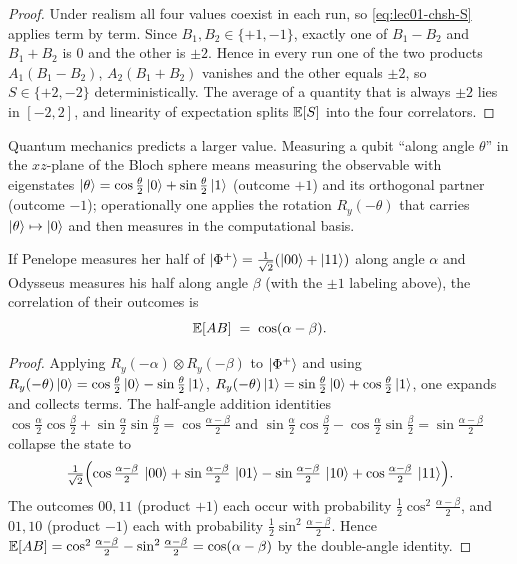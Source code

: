 \begin{proof}
Under realism all four values coexist in each run, so \eqref{eq:lec01-chsh-S} applies
term by term. Since $B_1,B_2\in\{+1,-1\}$, exactly one of $B_1-B_2$ and $B_1+B_2$
is $0$ and the other is $\pm2$. Hence in every run one of the two products
$A_1(B_1-B_2)$, $A_2(B_1+B_2)$ vanishes and the other equals $\pm2$, so $S\in\{+2,-2\}$
deterministically. The average of a quantity that is always $\pm2$ lies in $[-2,2]$,
and linearity of expectation splits $\mathbb{E}[S]$ into the four correlators.
\end{proof}

Quantum mechanics predicts a larger value. Measuring a qubit ``along angle $\theta$''
in the $xz$-plane of the Bloch sphere means measuring the observable with eigenstates
$\ket{\theta}=\cos\tfrac{\theta}{2}\ket{0}+\sin\tfrac{\theta}{2}\ket{1}$ (outcome
$+1$) and its orthogonal partner (outcome $-1$); operationally one applies the
rotation $R_y(-\theta)$ that carries $\ket{\theta}\mapsto\ket{0}$ and then measures in
the computational basis.

\begin{proposition}\label{prop:lec01-chsh-corr}
If Penelope measures her half of $\ket{\Phi^{+}}=\tfrac{1}{\sqrt2}(\ket{00}+\ket{11})$
along angle $\alpha$ and Odysseus measures his half along angle $\beta$ (with the $\pm1$
labeling above), the correlation of their outcomes is
\begin{equation}\label{eq:lec01-chsh-cosab}
  \mathbb{E}[AB]\;=\;\cos(\alpha-\beta).
\end{equation}
\end{proposition}

\begin{proof}
Applying $R_y(-\alpha)\otimes R_y(-\beta)$ to $\ket{\Phi^{+}}$ and using
$R_y(-\theta)\ket{0}=\cos\tfrac{\theta}{2}\ket{0}-\sin\tfrac{\theta}{2}\ket{1}$,
$R_y(-\theta)\ket{1}=\sin\tfrac{\theta}{2}\ket{0}+\cos\tfrac{\theta}{2}\ket{1}$,
one expands and collects terms. The half-angle addition identities
$\cos\tfrac{\alpha}{2}\cos\tfrac{\beta}{2}+\sin\tfrac{\alpha}{2}\sin\tfrac{\beta}{2}
=\cos\tfrac{\alpha-\beta}{2}$ and
$\sin\tfrac{\alpha}{2}\cos\tfrac{\beta}{2}-\cos\tfrac{\alpha}{2}\sin\tfrac{\beta}{2}
=\sin\tfrac{\alpha-\beta}{2}$ collapse the state to
\[
  \tfrac{1}{\sqrt2}\Bigl(\cos\tfrac{\alpha-\beta}{2}\,\ket{00}
      +\sin\tfrac{\alpha-\beta}{2}\,\ket{01}
      -\sin\tfrac{\alpha-\beta}{2}\,\ket{10}
      +\cos\tfrac{\alpha-\beta}{2}\,\ket{11}\Bigr).
\]
The outcomes $00,11$ (product $+1$) each occur with probability
$\tfrac12\cos^{2}\tfrac{\alpha-\beta}{2}$, and $01,10$ (product $-1$) each with
probability $\tfrac12\sin^{2}\tfrac{\alpha-\beta}{2}$. Hence
$\mathbb{E}[AB]=\cos^{2}\tfrac{\alpha-\beta}{2}-\sin^{2}\tfrac{\alpha-\beta}{2}=\cos(\alpha-\beta)$
by the double-angle identity.
\end{proof}

